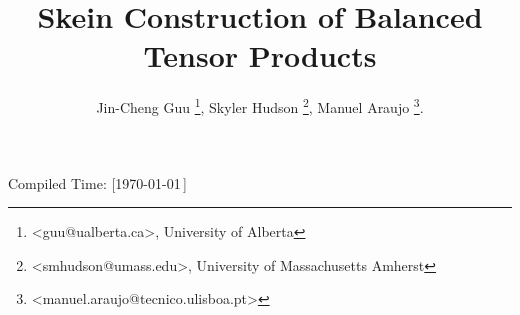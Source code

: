 \title{\vspace{-30pt} Skein Construction of Balanced Tensor Products}
\author{
  Jin-Cheng Guu \thanks{<guu@ualberta.ca>, University of Alberta},
  Skyler Hudson \thanks{<smhudson@umass.edu>, University of Massachusetts Amherst},
  Manuel Araujo \thanks{<manuel.araujo@tecnico.ulisboa.pt>}.
}
\date{}

\newcommand{\III}[9]{%
  {}^{#1}_{#2} I^{#3}_{#4}
  \left(
    \begin{matrix}
      #5 \\ {}\\ #6
    \end{matrix}
    \,\middle|\,
    \begin{matrix}
      #7 \\ #8 \\ #9
    \end{matrix}
  \right)
}
\newcommand{\II}[7]{%
  {}^{#1}_{#2} I^{#3}_{#4}
  \left( #5, #6
    \,\middle|\,
    #7
  \right)
}



\maketitle

\vspace{-30pt}


\begin{flushright}
  \tiny{Compiled Time: [\today\,\DTMcurrenttime]}
\end{flushright}

\vspace{-25pt}
\tableofcontents

